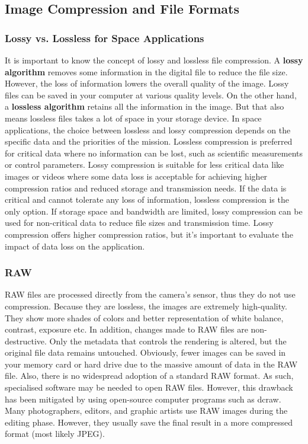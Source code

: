 \subsection{Image Compression and File Formats}

\subsubsection{Lossy vs. Lossless for Space Applications}
It is important to know the concept of lossy and lossless file compression. A \textbf{lossy algorithm} removes some information in the digital file to reduce the file size. However, the loss of information lowers the overall quality of the image. Lossy files can be saved in your computer at various quality levels.
On the other hand, a \textbf{lossless algorithm} retains all the information in the image. But that also means lossless files takes a lot of space in your storage device.
\nl
In space applications, the choice between lossless and lossy compression depends on the specific data and the priorities of the mission.
Lossless compression is preferred for critical data where no information can be lost, such as scientific measurements or control parameters. Lossy compression is suitable for less critical data like images or videos where some data loss is acceptable for achieving higher compression ratios and reduced storage and transmission needs.
\nl
If the data is critical and cannot tolerate any loss of information, lossless compression is the only option.
If storage space and bandwidth are limited, lossy compression can be used for non-critical data to reduce file sizes and transmission time. Lossy compression offers higher compression ratios, but it's important to evaluate the impact of data loss on the application.

\subsubsection{RAW}
RAW files are processed directly from the camera's sensor, thus they do not use compression. Because they are lossless, the images are extremely high-quality. They show more shades of colors and better representation of white balance, contrast, exposure  etc. In addition, changes made to RAW files are non-destructive. Only the metadata that controls the rendering is altered, but the original file data remains untouched.
\nl
Obviously, fewer images can be saved in your memory card or hard drive due to the massive amount of data in the RAW file. Also, there is no widespread adoption of a standard RAW format.
As such, specialised software may be needed to open RAW files. However, this drawback has been mitigated by using open-source computer programs such as dcraw.
\nl
Many photographers, editors, and graphic artists use RAW images during the editing phase. However, they usually save the final result in a more compressed format (most likely JPEG).

